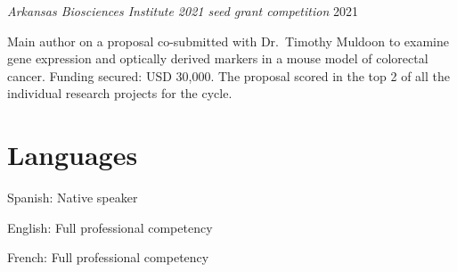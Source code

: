 \documentclass[10pt,]{article}
\renewenvironment{itemize}{
  \begin{list}{}{
    \setlength{\leftmargin}{1.5em}
  }
}{
  \end{list}
}
\begin{document}
\emph{Arkansas Biosciences Institute 2021 seed grant competition }
\hfill 2021

Main author on a proposal co-submitted with Dr.~Timothy Muldoon to
examine gene expression and optically derived markers in a mouse model
of colorectal cancer. Funding secured: USD 30,000. The proposal scored
in the top 2 of all the individual research projects for the cycle.

\section{Languages}\label{languages}

\begin{itemize}
\item
  Spanish: Native speaker
\item
  English: Full professional competency
\item
  French: Full professional competency
\end{itemize}
\end{document}
